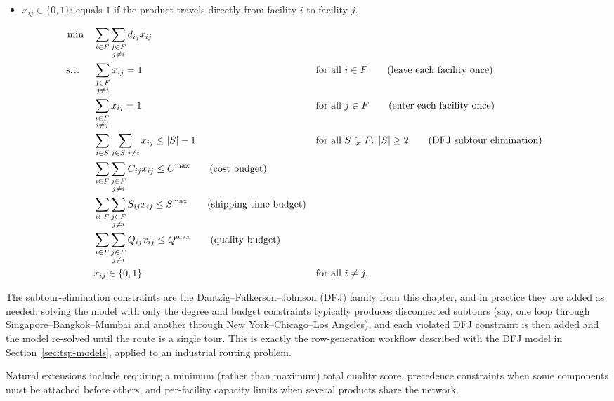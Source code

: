 \begin{itemize}
    \item $x_{ij} \in \{0,1\}$: equals $1$ if the product travels directly from facility $i$ to facility $j$.
\end{itemize}

\begin{align*}
\min \quad & \sum_{i \in F} \sum_{\substack{j \in F \\ j \neq i}} d_{ij} x_{ij} \\
\mbox{ s.t. } \quad  & \sum_{\substack{j \in F \\ j \neq i}} x_{ij} = 1 && \mbox{for all } i \in F \tag{leave each facility once} \\
           & \sum_{\substack{i \in F \\ i \neq j}} x_{ij} = 1 && \mbox{for all } j \in F \tag{enter each facility once} \\
           & \sum_{i \in S}\sum_{j \in S, j \neq i} x_{ij} \leq |S| - 1 && \mbox{for all } S \subsetneq F,\ |S| \geq 2 \tag{DFJ subtour elimination} \\
           & \sum_{i \in F} \sum_{\substack{j \in F \\ j \neq i}} C_{ij} x_{ij} \leq C^{\max} \tag{cost budget} \\
           & \sum_{i \in F} \sum_{\substack{j \in F \\ j \neq i}} S_{ij} x_{ij} \leq S^{\max} \tag{shipping-time budget} \\
           & \sum_{i \in F} \sum_{\substack{j \in F \\ j \neq i}} Q_{ij} x_{ij} \leq Q^{\max} \tag{quality budget} \\
           & x_{ij} \in \{0,1\} && \mbox{for all } i \neq j.
\end{align*}

The subtour-elimination constraints are the Dantzig--Fulkerson--Johnson (DFJ) family from this chapter, and in practice they are added as needed: solving the model with only the degree and budget constraints typically produces disconnected subtours (say, one loop through Singapore--Bangkok--Mumbai and another through New York--Chicago--Los Angeles), and each violated DFJ constraint is then added and the model re-solved until the route is a single tour. This is exactly the row-generation workflow described with the DFJ model in Section~\ref{sec:tsp-models}, applied to an industrial routing problem.

Natural extensions include requiring a minimum (rather than maximum) total quality score, precedence constraints when some components must be attached before others, and per-facility capacity limits when several products share the network.

